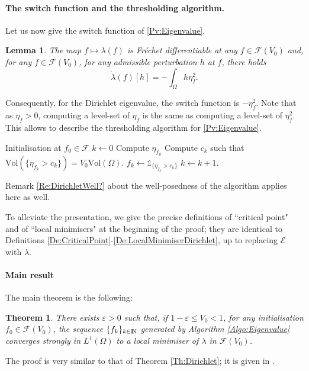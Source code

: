 \documentclass{article}
\newcommand{\N}{\textnormal{I\kern-0.21emN}}
\renewcommand{\leq}{\leqslant}
\def\e{{\varepsilon}}
\newtheorem{theorem}{Theorem}\renewcommand\thetheorem{\Roman{theorem}}
\newtheorem{lemma}[material]{Lemma}
\def\O{{\Omega}}
\numberwithin{equation}{section}
\begin{document}
\paragraph{The switch function and the thresholding algorithm.}
Let us now give the switch function of \eqref{Pv:Eigenvalue}.%
\begin{lemma}\label{Le:SwitchEigenvalue}
The map $f\mapsto \lambda(f)$ is Fr\'echet differentiable at any $f\in \mathcal F(V_0)$ and, for any $f\in \mathcal F(V_0)$, for any admissible perturbation $h$ at $f$, there holds
\[ \dot{\lambda}(f)[h]=-\int_\O h \eta_f^2.\]
\end{lemma}
Consequently, for the Dirichlet eigenvalue, the switch function is $-\eta_f^2$. Note that as $\eta_f>0$,  computing a level-set of $\eta_f$ is the same as computing a level-set of $\eta_f^2$. This allows to describe the thresholding algorithm for \eqref{Pv:Eigenvalue}.
\begin{algorithm}[H]
\caption{Thresholding algorithm for the Dirichlet eigenvalue}\label{Algo:Eigenvalue}
\begin{algorithmic}[1]
\State Initialisation at $f_0\in \mathcal F$
\State $k\gets 0$
\State Compute $\eta_{f_k}$
\State Compute $c_k$ such that $\mathrm{Vol}(\{\eta_{f_k}>c_k\})=V_0\mathrm{Vol}(\O)$.
\State $f_k\gets \mathds 1_{\{\eta_{f_k}>c_k\}}$
\State $k\gets k+1$.
\end{algorithmic}
\end{algorithm}


Remark \ref{Re:DirichletWell?} about the well-posedness of the algorithm applies here as well.

 To alleviate the presentation, we give the precise definitions of  ``critical point" and of ``local minimisers" at the beginning of the proof; they are identical to Definitions \ref{De:CriticalPoint}-\ref{De:LocalMinimiserDirichlet}, up to replacing  $\mathscr E$ with $\lambda$.

\paragraph{Main result}
The main theorem is the following:

\begin{theorem}\label{Th:Eigenvalue}
There exists $\e>0$ such that, if $1-\e\leq V_0<1$, for any initialisation $f_0\in \mathcal F(V_0)$, the sequence $\{f_k\}_{k\in \N}$ generated by Algorithm \ref{Algo:Eigenvalue} converges strongly in $L^1(\O)$ to a local minimiser of $\lambda$ in $\mathcal F(V_0)$.
\end{theorem}
The proof is very similar to that of Theorem \ref{Th:Dirichlet}; it is given in \cite[Section A]{CMFPSP}.
\end{document}
